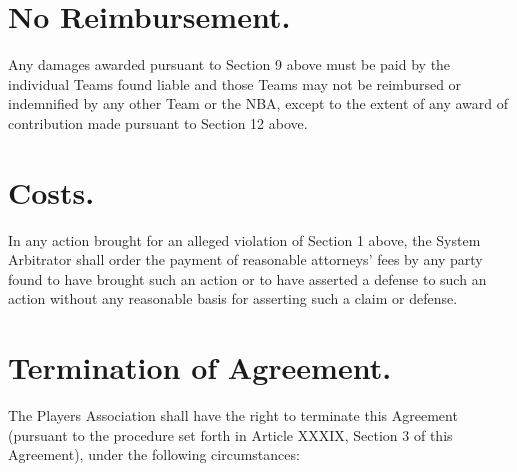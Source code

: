 \documentclass[
]{book}
\begin{document}
\hypertarget{no-reimbursement.}{%
\section{No Reimbursement.}\label{no-reimbursement.}}

Any damages awarded pursuant to Section 9 above must be paid by the individual Teams found liable and those Teams may not be reimbursed or indemnified by any other Team or the NBA, except to the extent of any award of contribution made pursuant to Section 12 above.

\hypertarget{costs.}{%
\section{Costs.}\label{costs.}}

In any action brought for an alleged violation of Section 1 above, the System Arbitrator shall order the payment of reasonable attorneys' fees by any party found to have brought such an action or to have asserted a defense to such an action without any reasonable basis for asserting such a claim or defense.

\hypertarget{termination-of-agreement.}{%
\section{Termination of Agreement.}\label{termination-of-agreement.}}

The Players Association shall have the right to terminate this Agreement (pursuant to the procedure set forth in Article XXXIX, Section 3 of this Agreement), under the following circumstances:
\end{document}
